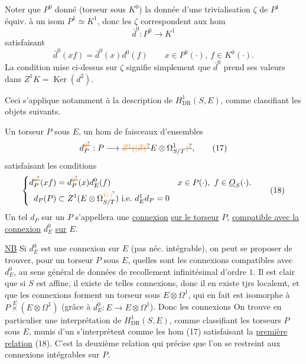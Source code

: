 Noter que  $P^0$ donné (torseur sous $K^0$) la
donnée d'une trivialisation $\zeta$ de $P^1$ équiv. à un isom
$P^1\simeq K^1$, donc les $\zeta$ correspondent 
aux hom
\[
\bar d^0:P^0\longrightarrow K^1
\]
satisfaisant
\[
\bar d^0(xf)=\bar d^0(x)d^0(f)\qquad x\in P^0(\cdot),\ f\in K^0(\cdot).
\]
La condition mise ci-dessus sur $\zeta$ signifie simplement que $\bar d^0$ prend ses valeurs dans $Z^1K=\operatorname{Ker}(d^2)$.

Ceci s'applique notamment à la description
de $H^1_{\mathrm{DR}}(S,E)$, comme classifiant les objets suivants.

Un torseur $P$ sous $E$, un hom de faisceaux
d'ensembles
\[
d_P^{\deleted{\unsure{0}}}:P\longrightarrow\deleted{\unsure{Z^1(|Z(}}E\otimes\Omega^1_{S/T}\deleted{\unsure{)}}, \tag*{(17)}
\]
satisfaisant les conditions
\[
\left\{\begin{aligned}
d_P^{\deleted{\unsure{0}}}(xf)&=d_P^{\deleted{\unsure{0}}}(x)d_E^0(f)
 &x&\in P(\cdot),\ f\in\underline O_S(\cdot).\\
d_P(P)&\subset Z^1(E\otimes\Omega^{\unsure{1|\cdot|{}}}_{S/T})\ \text{i.e.}\ d_E^1d_P=0
\end{aligned}\right. \tag*{(18)}
\]
Un tel $d_P$ sur un $P$ s'appellera une \uline{connexion}  \uline{sur
le torseur} $P$, \uline{compatible avec la connexion}  $d_E^0$ \uline{sur} $E$.

\uline{NB} Si $d_E^0$ est une connexion sur $E$ (pas néc. intégrable),
 on peut se proposer de trouver, pour un torseur $P$ sous $E$,
quelles sont les connexions compatibles avec $d_E^0$, au sens
général  de données de recollement infinitésimal
d'ordre $1$. Il est clair que si $S$ est affine, il existe
de telles connexions, donc il en existe tjrs localemt,
et que les connexions forment un torseur sous
$E\otimes\Omega^1$, qui en fait est isomorphe à $P\mathbin{\overset E{\times}}(E\otimes\Omega^1)$
(grâce à $d_E^0:E\longrightarrow E\otimes\Omega^1$). Donc les connexions
On trouve en particulier une interprétation de
$H^1_{\mathrm{DR}}(S,E)$, comme classifiant les torseurs $P$ sous $E$,
munis d'un
s'interprètent comme les hom (17) satisfaisant
la \uline{première relation} (18).  C'est la
deuxième relation qui précise que l'on se restreint
aux connexions intégrables sur $P$.


